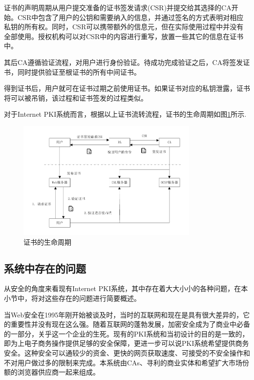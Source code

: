 证书的声明周期从用户提交准备的证书签发请求(CSR)并提交给其选择的CA开始。CSR中包含了用户的公钥和需要纳入的信息，并通过签名的方式表明对相应私钥的所有权。同时，CSR可以携带额外的信息元，但在实际使用过程中并没有全部使用。授权机构可以对CSR中的内容进行重写，放置一些其它的信息在证书中。

其后CA遵循验证流程，对用户进行身份验证。待成功完成验证之后，CA将签发证书，同时提供验证至根证书的所有中间证书。

得到证书后，用户就可在证书过期之前使用证书。如果证书对应的私钥泄露，证书将可以被吊销，该过程和证书签发的过程类似。

对于Internet PKI系统而言，根据以上证书流转流程，证书的生命周期如图\ref{fig:cert_lifecycle}所示.

\begin{figure}[htbp]
 	\centering
 	\includegraphics[width = 0.8\textwidth]{img/cert_lifecycle}
 	\caption{证书的生命周期}\label{fig:cert_lifecycle}
\end{figure}

\subsection{系统中存在的问题}

从安全的角度来看现有Internet PKI系统，其中存在着大大小小的各种问题，在本小节中，将对这些存在的问题进行简要概述。

当Web安全在1995年刚开始被谈及时，当时的互联网和现在是具有很大差异的，它的重要性并没有现在这么强。随着互联网的蓬勃发展，加密安全成为了商业中必备的一部分，关乎这一个企业的生死。现有的PKI系统和当初设计的目的是一致的，即为上电子商务操作提供足够的安全保障，更进一步可以说PKI系统希望提供商务安全。这种安全可以通较少的资金、更快的网页获取速度、可接受的不安全操作和不对用户做过多的限制来完成。本系统由CAs、寻利的商业实体和希望扩大市场份额的浏览器供应商一起来组成。

